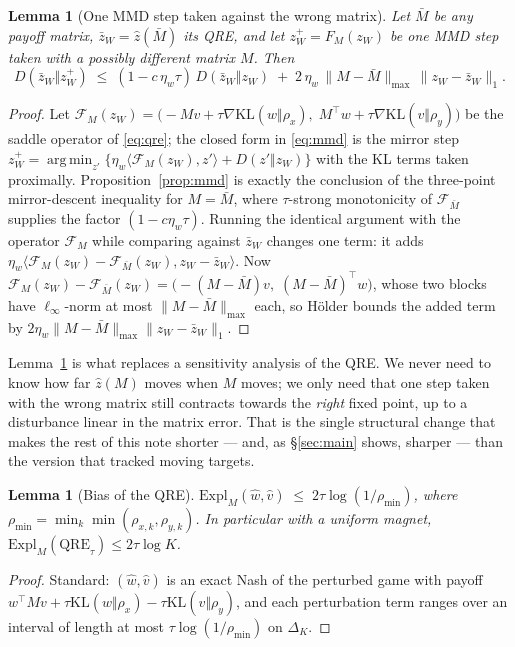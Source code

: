 \documentclass[11pt,a4paper]{article}
\theoremstyle{plain}
\newtheorem{lemma}[theorem]{Lemma}
\theoremstyle{definition}
\theoremstyle{remark}
\DeclareMathOperator*{\argmin}{arg\,min}
\newcommand{\KL}{\mathrm{KL}}
\newcommand{\Expl}{\mathrm{Expl}}
\newcommand{\QRE}{\mathrm{QRE}}
\newcommand{\simplex}{\Delta}
\newcommand{\ip}[2]{\langle #1, #2\rangle}
\newcommand{\norm}[1]{\lVert #1 \rVert}
\begin{document}
\begin{lemma}[One MMD step taken against the wrong matrix]\label{lem:mmdpert}
Let $\bar M$ be any payoff matrix, $\bar z_W=\hat z(\bar M)$ its QRE, and let
$z_W^+=F_M(z_W)$ be one MMD step taken with a possibly different matrix $M$. Then
\[
D(\bar z_W\Vert z_W^+)\;\le\;(1-c\,\eta_w\tau)\,D(\bar z_W\Vert z_W)
\;+\;2\,\eta_w\,\norm{M-\bar M}_{\max}\,\norm{z_W-\bar z_W}_1 .
\]
\end{lemma}
\begin{proof}
Let
$\mathcal F_M(z_W)=\big(-Mv+\tau\nabla\KL(w\Vert\rho_x),\;M^\top w+\tau\nabla\KL(v\Vert\rho_y)\big)$
be the saddle operator of \eqref{eq:qre}; the closed form in \eqref{eq:mmd} is the mirror
step $z_W^+=\argmin_{z'}\{\eta_w\ip{\mathcal F_M(z_W)}{z'}+D(z'\Vert z_W)\}$ with the KL
terms taken proximally. Proposition~\ref{prop:mmd} is exactly the conclusion of the
three-point mirror-descent inequality for $M=\bar M$, where $\tau$-strong monotonicity
of $\mathcal F_{\bar M}$ supplies the factor $(1-c\eta_w\tau)$. Running the identical
argument with the operator $\mathcal F_M$ while comparing against $\bar z_W$ changes one
term: it adds $\eta_w\ip{\mathcal F_M(z_W)-\mathcal F_{\bar M}(z_W)}{z_W-\bar z_W}$. Now
$\mathcal F_M(z_W)-\mathcal F_{\bar M}(z_W)=\big(-(M-\bar M)v,\;(M-\bar M)^\top w\big)$,
whose two blocks have $\ell_\infty$-norm at most $\norm{M-\bar M}_{\max}$ each, so
H\"older bounds the added term by $2\eta_w\norm{M-\bar M}_{\max}\norm{z_W-\bar z_W}_1$.
\end{proof}

\noindent Lemma~\ref{lem:mmdpert} is what replaces a sensitivity analysis of the QRE.
We never need to know how far $\hat z(M)$ moves when $M$ moves; we only need that one
step taken with the wrong matrix still contracts towards the \emph{right} fixed point,
up to a disturbance linear in the matrix error. That is the single structural change
that makes the rest of this note shorter --- and, as \S\ref{sec:main} shows, sharper ---
than the version that tracked moving targets.

\begin{lemma}[Bias of the QRE]\label{lem:bias}
$\Expl_M(\hat w,\hat v)\;\le\;2\tau\log(1/\rho_{\min})$, where
$\rho_{\min}=\min_k\min(\rho_{x,k},\rho_{y,k})$. In particular with a uniform
magnet, $\Expl_M(\QRE_\tau)\le 2\tau\log K$.
\end{lemma}
\begin{proof}
Standard: $(\hat w,\hat v)$ is an exact Nash of the perturbed game with payoff
$w^\top Mv + \tau\KL(w\Vert\rho_x)-\tau\KL(v\Vert\rho_y)$, and each perturbation term
ranges over an interval of length at most $\tau\log(1/\rho_{\min})$ on $\simplex_K$.
\end{proof}
\end{document}
